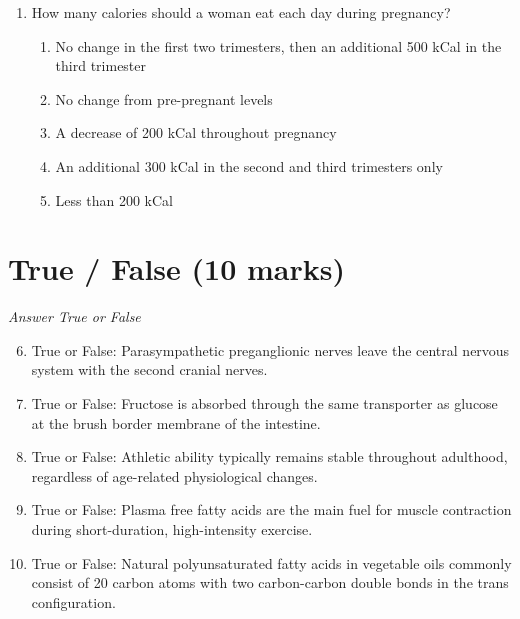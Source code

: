 \documentclass[12pt]{article}
\begin{document}
\begin{enumerate}[label=\arabic*.]
\begin{enumerate}[label=(\alph*)]
    \item Vitamin D supplements
    \item Fruit and vegetables
    \item Salt
    \item Red meat
    \item Dairy products
\end{enumerate}
\item How many calories should a woman eat each day during pregnancy?
\begin{enumerate}[label=(\alph*)]
    \item No change in the first two trimesters, then an additional 500 kCal in the third trimester
    \item No change from pre-pregnant levels
    \item A decrease of 200 kCal throughout pregnancy
    \item An additional 300 kCal in the second and third trimesters only
    \item Less than 200 kCal
\end{enumerate}
\end{enumerate}

\section*{True / False (10 marks)}
\textit{Answer True or False}
\begin{enumerate}[label=\arabic*.]
\setcounter{enumi}{5}
\item True or False: Parasympathetic preganglionic nerves leave the central nervous system with the second cranial nerves.
\item True or False: Fructose is absorbed through the same transporter as glucose at the brush border membrane of the intestine.
\item True or False: Athletic ability typically remains stable throughout adulthood, regardless of age-related physiological changes.
\item True or False: Plasma free fatty acids are the main fuel for muscle contraction during short-duration, high-intensity exercise.
\item True or False: Natural polyunsaturated fatty acids in vegetable oils commonly consist of 20 carbon atoms with two carbon-carbon double bonds in the trans configuration.
\end{enumerate}
\end{document}
